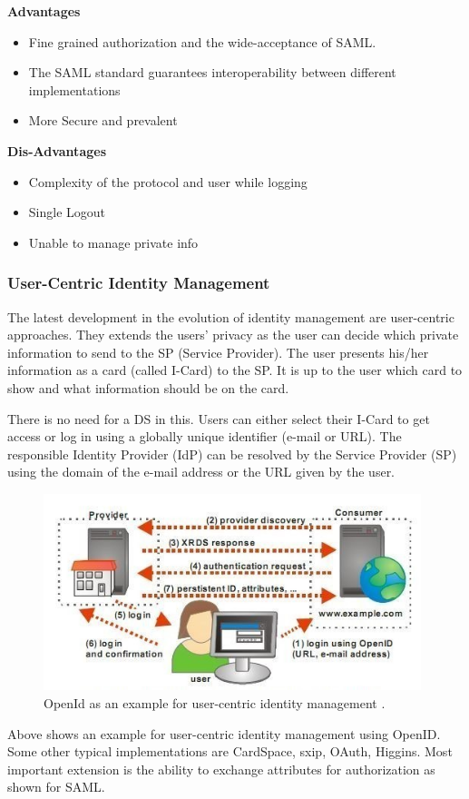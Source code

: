 \documentclass[12pt]{report}
\begin{document}
	\textbf{Advantages}
	\begin{itemize}
		\item Fine grained authorization and the wide-acceptance of SAML.
		\item The SAML standard guarantees interoperability between different implementations
		\item More Secure and prevalent
	\end{itemize}
	\textbf{Dis-Advantages}
	\begin{itemize}
	\item Complexity of the protocol and user while logging
	\item Single Logout
	\item Unable to manage private info
	\end{itemize}

	\subsubsection{User-Centric Identity Management}
	The latest development in the evolution of identity management are user-centric approaches. They extends the users’ privacy as the user can decide which private information to send to the SP (Service Provider). The user presents his/her information as a card (called I-Card) to the SP. It is up to the user which card to show and what information should be on the card.\newline
	
	There is no need for a DS in this. Users can either select their I-Card to get access or log in using a globally unique identifier (e-mail or URL).  The responsible Identity Provider (IdP) can be resolved by the Service Provider (SP) using the domain of the e-mail address or the URL given by the user.
	\begin{figure}[H]
	\begin{center}
	\includegraphics[width=11cm]{./3-2.jpg}
	\caption{ OpenId as an example for user-centric identity management . \label{fig:OpenId as an example for user-centric identity management . }}
	\end{center}
	\end{figure}
	Above shows an example for user-centric identity management using OpenID. Some other typical implementations are CardSpace, sxip, OAuth, Higgins. Most important extension is the ability to exchange attributes for authorization as shown for SAML.\newline
	
\end{document}
